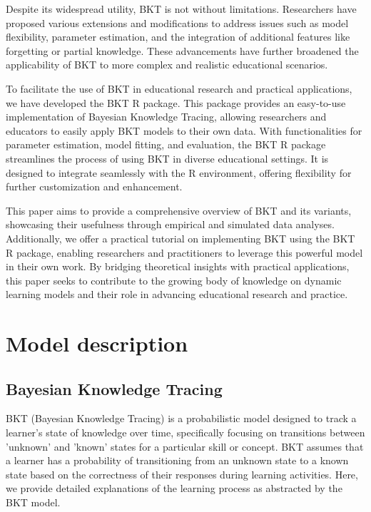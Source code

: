 \documentclass{article}
\begin{document}
Despite its widespread utility, BKT is not without limitations. Researchers have proposed various extensions and modifications to address issues such as model flexibility, parameter estimation, and the integration of additional features like forgetting or partial knowledge. These advancements have further broadened the applicability of BKT to more complex and realistic educational scenarios.

To facilitate the use of BKT in educational research and practical applications, we have developed the BKT R package. This package provides an easy-to-use implementation of Bayesian Knowledge Tracing, allowing researchers and educators to easily apply BKT models to their own data. With functionalities for parameter estimation, model fitting, and evaluation, the BKT R package streamlines the process of using BKT in diverse educational settings. It is designed to integrate seamlessly with the R environment, offering flexibility for further customization and enhancement.

This paper aims to provide a comprehensive overview of BKT and its variants, showcasing their usefulness through empirical and simulated data analyses. Additionally, we offer a practical tutorial on implementing BKT using the BKT R package, enabling researchers and practitioners to leverage this powerful model in their own work. By bridging theoretical insights with practical applications, this paper seeks to contribute to the growing body of knowledge on dynamic learning models and their role in advancing educational research and practice.

\section{Model description}

\subsection{Bayesian Knowledge Tracing}
BKT (Bayesian Knowledge Tracing) is a probabilistic model designed to track a learner’s state of knowledge over time, specifically focusing on transitions between 'unknown' and 'known' states for a particular skill or concept. BKT assumes that a learner has a probability of transitioning from an unknown state to a known state based on the correctness of their responses during learning activities. Here, we provide detailed explanations of the learning process as abstracted by the BKT model.
\end{document}
